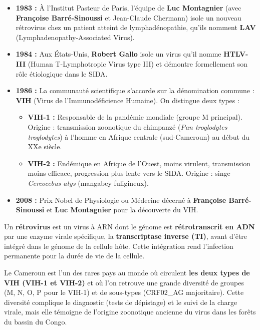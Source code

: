\documentclass[11pt]{article}
\begin{document}
\begin{itemize}
    \item \textbf{1983 :} À l'Institut Pasteur de Paris, l'équipe de \textbf{Luc Montagnier} (avec \textbf{Françoise Barré-Sinoussi} et Jean-Claude Chermann) isole un nouveau rétrovirus chez un patient atteint de lymphadénopathie, qu'ils nomment \textbf{LAV} (Lymphadenopathy-Associated Virus).
    \item \textbf{1984 :} Aux États-Unis, \textbf{Robert Gallo} isole un virus qu'il nomme \textbf{HTLV-III} (Human T-Lymphotropic Virus type III) et démontre formellement son rôle étiologique dans le SIDA.
    \item \textbf{1986 :} La communauté scientifique s'accorde sur la dénomination commune : \textbf{VIH} (Virus de l'Immunodéficience Humaine). On distingue deux types :
    \begin{itemize}
        \item \textbf{VIH-1 :} Responsable de la pandémie mondiale (groupe M principal). Origine : transmission zoonotique du chimpanzé (\emph{Pan troglodytes troglodytes}) à l'homme en Afrique centrale (sud-Cameroun) au début du XXe siècle.
        \item \textbf{VIH-2 :} Endémique en Afrique de l'Ouest, moins virulent, transmission moins efficace, progression plus lente vers le SIDA. Origine : singe \emph{Cercocebus atys} (mangabey fuligineux).
    \end{itemize}
    \item \textbf{2008 :} Prix Nobel de Physiologie ou Médecine décerné à \textbf{Françoise Barré-Sinoussi} et \textbf{Luc Montagnier} pour la découverte du VIH.
\end{itemize}

\begin{definition}[Rétrovirus]
Un \textbf{rétrovirus} est un virus à ARN dont le génome est \textbf{rétrotranscrit en ADN} par une enzyme virale spécifique, la \textbf{transcriptase inverse (TI)}, avant d'être intégré dans le génome de la cellule hôte. Cette intégration rend l'infection permanente pour la durée de vie de la cellule.
\end{definition}

\begin{savaistu}
Le Cameroun est l'un des rares pays au monde où circulent \textbf{les deux types de VIH (VIH-1 et VIH-2)} et où l'on retrouve une grande diversité de groupes (M, N, O, P pour le VIH-1) et de sous-types (CRF02\_AG majoritaire). Cette diversité complique le diagnostic (tests de dépistage) et le suivi de la charge virale, mais elle témoigne de l'origine zoonotique ancienne du virus dans les forêts du bassin du Congo.
\end{savaistu}
\end{document}
